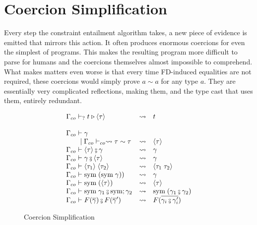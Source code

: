\chapter{Coercion Simplification}
\label{cha:co-simpl}

Every step the constraint entailment algorithm takes, a new piece of evidence is
emitted that mirrors this action. It often produces enormous coercions for even
the simplest of programs. This makes the resulting program more difficult to
parse for humans and the coercions themselves almost impossible to comprehend.
What makes matters even worse is that every time FD-induced equalities are not
required, these coercions would simply prove $a \sim a$ for any type $a$. They
are essentially very complicated reflections, making them, and the type cast
that uses them, entirely redundant.

\begin{figure}
\[
\begin{array}{l c l}
\Gamma_{co} \vdash_{?} t \triangleright \langle \tau \rangle &\rightsquigarrow& t\\
\\
\Gamma_{co} \vdash \gamma \\
\guard \Gamma_{co} \vdash_{co} \rightsquigarrow \tau \sim \tau &\rightsquigarrow& \langle \tau
\rangle
\\
\Gamma_{co} \vdash \langle \tau \rangle \fctrans \gamma &\rightsquigarrow& \gamma
\\
\Gamma_{co} \vdash \gamma \fctrans \langle \tau \rangle &\rightsquigarrow& \gamma
\\
\Gamma_{co} \vdash \langle \tau_1 \rangle \; \langle \tau_2 \rangle
&\rightsquigarrow& \langle \tau_1 \; \tau_2 \rangle
\\
\Gamma_{co} \vdash \text{sym} \; (\text{sym} \; \gamma)) &\rightsquigarrow& \gamma
\\
\Gamma_{co} \vdash \text{sym} \; (\langle \tau \rangle) &\rightsquigarrow& \langle \tau \rangle
\\
\Gamma_{co} \vdash \text{sym} \; \gamma_1 \fctrans \text{sym} ; \gamma_2
&\rightsquigarrow& \text{sym} \; (\gamma_1 \fctrans \gamma_2)
\\
\Gamma_{co} \vdash F(\overline{\gamma}) \fctrans F(\overline{\gamma}')
&\rightsquigarrow& F(\overline{\gamma_i \fctrans \gamma_i'})
\end{array}
\]
\caption{Coercion Simplification}
\label{fig:co-simpl}
\end{figure}

